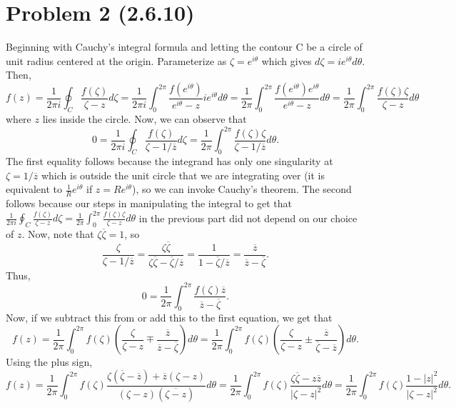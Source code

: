\documentclass{article}
\begin{document}
\section{Problem 2 (2.6.10)} 
Beginning with Cauchy's integral formula and letting the contour C be a circle of unit radius centered at the origin. Parameterize as $\zeta=e^{i\theta}$ which gives $d\zeta=ie^{i\theta}d\theta$. Then, 
\[
f(z)=\frac{1}{2\pi i}\oint_C\frac{f(\zeta)}{\zeta-z}d\zeta=\frac{1}{2\pi i}\int_0^{2\pi}\frac{f(e^{i\theta})}{e^{i\theta}-z}ie^{i\theta}d\theta=\frac{1}{2\pi }\int_0^{2\pi}\frac{f(e^{i\theta})e^{i\theta}}{e^{i\theta}-z}d\theta=\frac{1}{2\pi }\int_0^{2\pi}\frac{f(\zeta)\zeta}{\zeta-z}d\theta
\]
where $z$ lies inside the circle. Now, we can observe that 
\[
0=\frac{1}{2\pi i}\oint_C\frac{f(\zeta)}{\zeta-1/\overline{z}}d\zeta=\frac{1}{2\pi }\int_0^{2\pi}\frac{f(\zeta)\zeta}{\zeta-1/\overline{z}}d\theta.
\]
The first equality follows because the integrand has only one singularity at $\zeta=1/\overline{z}$ which is outside the unit circle that we are integrating over (it is equivalent to $\frac{1}{R}e^{i\theta}$ if $z=Re^{i\theta}$), so we can invoke Cauchy's theorem. The second follows because our steps in manipulating the integral to get that $\frac{1}{2\pi i}\oint_C\frac{f(\zeta)}{\zeta-z}d\zeta=\frac{1}{2\pi }\int_0^{2\pi}\frac{f(\zeta)\zeta}{\zeta-z}d\theta$ in the previous part did not depend on our choice of $z$. Now, note that $\zeta\overline{\zeta}=1$, so
\[
\frac{\zeta}{\zeta-1/\overline{z}}=\frac{\zeta\overline{\zeta}}{\zeta\overline{\zeta}-\overline{\zeta}/\overline{z}}=\frac{1}{1-\overline{\zeta}/\overline{z}}=\frac{\overline{z}}{\overline{z}-\overline{\zeta}}.
\]
Thus, 
\[
0=\frac{1}{2\pi}\int_0^{2\pi}\frac{f(\zeta)\overline{z}}{\overline{z}-\overline{\zeta}}.
\]
Now, if we subtract this from or add this to the first equation, we get that 
\[
f(z)=\frac{1}{2\pi}\int_0^{2\pi}f(\zeta)\left(\frac{\zeta}{\zeta-z}\mp\frac{\overline{z}}{\overline{z}-\overline{\zeta}}\right)d\theta=\frac{1}{2\pi}\int_0^{2\pi}f(\zeta)\left(\frac{\zeta}{\zeta-z}\pm\frac{\overline{z}}{\overline{\zeta}-\overline{z}}\right)d\theta.
\]
Using the plus sign,
\[
f(z)=\frac{1}{2\pi}\int_0^{2\pi}f(\zeta)\frac{\zeta(\overline{\zeta}-\overline{z})+\overline{z}(\zeta-z)}{(\zeta-z)(\overline{\zeta-z})}d\theta=\frac{1}{2\pi}\int_0^{2\pi}f(\zeta)\frac{\zeta\overline{\zeta}-z\overline{z}}{|\zeta-z|^2}d\theta=\frac{1}{2\pi}\int_0^{2\pi}f(\zeta)\frac{1-|z|^2}{|\zeta-z|^2}d\theta.
\]
\end{document}
